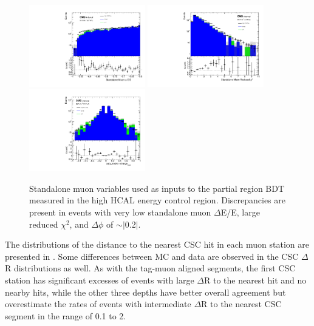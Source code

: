 \begin{figure}[htbp]
	\centering
	\includegraphics[width=0.45\textwidth]{figures/standaloneMuonValidation.pdf}
	\hspace{0.01\textwidth}
	\includegraphics[width=0.45\textwidth]{figures/standaloneMuonChiValidation.pdf}
	\vspace{0.01\textwidth}
	\includegraphics[width=0.45\textwidth]{figures/standaloneMuonPhiValidation.pdf}
        \caption[Standalone Muon Validation]{Standalone muon variables used as inputs to the partial region BDT measured in the high HCAL energy control region. Discrepancies are present in events with very low standalone muon $\Delta$E/E, large reduced $\chi^{2}$, and $\Delta\phi$ of $\sim|$0.2$|$.}
        \label{fig:BDTstavalid}
\end{figure}

The distributions of the distance to the nearest CSC hit in each muon station are presented in . 
Some differences between MC and data are observed in the CSC $\Delta$R distributions as well. 
As with the tag-muon aligned segments, the first CSC station has significant excesses of events with large $\Delta$R to the nearest hit and no nearby hits, while the other three depths have better overall agreement but overestimate the rates of events with intermediate $\Delta$R to the nearest CSC segment in the range of 0.1 to 2.

